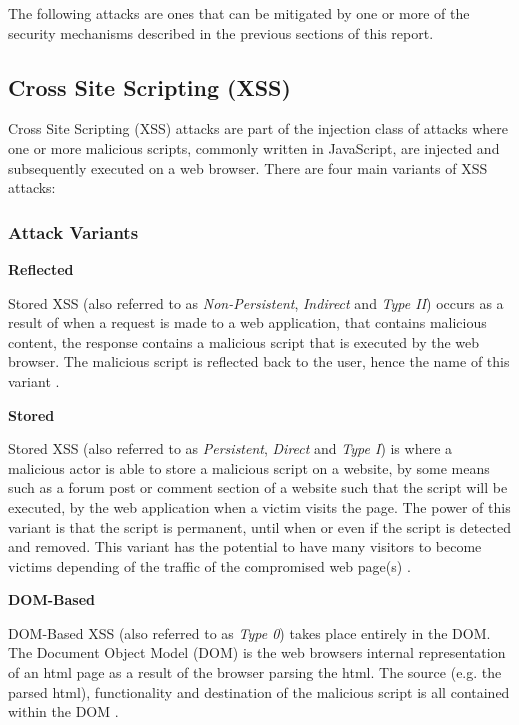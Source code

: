 \documentclass{mscreport}
\begin{document}
\vspace{0.3cm} \noindent
The following attacks are ones that can be mitigated by one or more of the security mechanisms described in the previous sections of this report.

\subsection{Cross Site Scripting (XSS)}
\label{subsection:XSS}

Cross Site Scripting (XSS) attacks are part of the injection class of attacks where one or more malicious scripts, commonly written in JavaScript, are injected and subsequently executed on a web browser. There are four main variants of XSS attacks:

\subsubsection{Attack Variants}
\textbf{Reflected}

\vspace{0.2cm} \noindent
Stored XSS (also referred to as \textit{Non-Persistent}, \textit{Indirect} and \textit{Type II}) occurs as a result of when a request is made to a web application, that contains malicious content, the response contains a malicious script that is executed by the web browser. The malicious script is reflected back to the user, hence the name of this variant \cite{Rodriguez2020-bg}.

\vspace{0.6cm} \noindent
\textbf{Stored}

\vspace{0.2cm} \noindent
Stored XSS (also referred to as \textit{Persistent}, \textit{Direct} and \textit{Type I}) is where a malicious actor is able to store a malicious script on a website, by some means such as a forum post or comment section of a website such that the script will be executed, by the web application when a victim visits the page. The power of this variant is that the script is permanent, until when or even if the script is detected and removed. This variant has the potential to have many visitors to become victims depending of the traffic of the compromised web page(s) \cite{Rodriguez2020-bg}.

\vspace{0.6cm} \noindent
\textbf{DOM-Based}

\vspace{0.2cm} \noindent
DOM-Based XSS (also referred to as \textit{Type 0}) takes place entirely in the DOM. The Document Object Model (DOM) is the web browsers internal representation of an html page as a result of the browser parsing the html. The source (e.g. the parsed html), functionality and destination of the malicious script is all contained within the DOM \cite{Rodriguez2020-bg,Klein2005-hx}.
\end{document}
